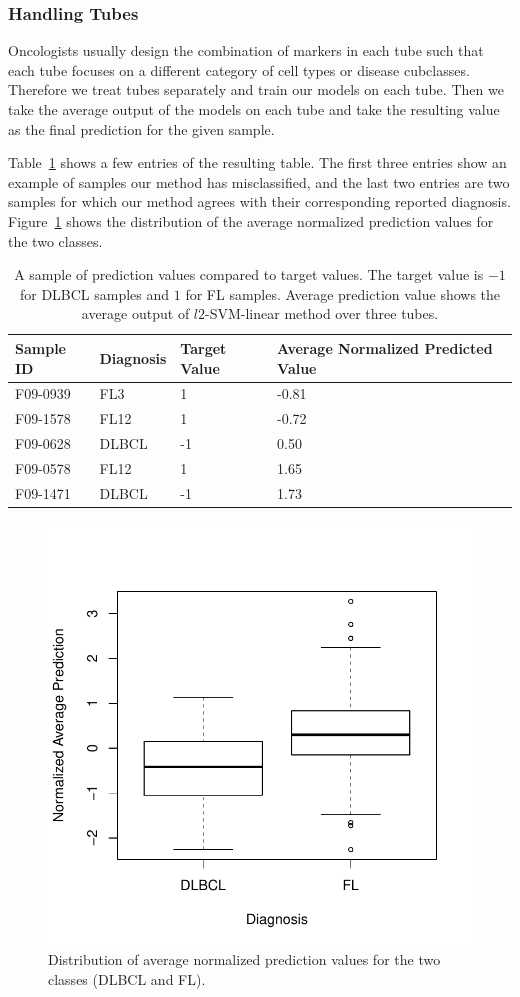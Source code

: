 \subsubsection{Handling Tubes}
Oncologists usually design the combination of markers in each tube such that each tube focuses on a different category of cell types or disease cubclasses. Therefore we treat tubes separately and train our models on each tube. Then we take the average output of the models on each tube and take the resulting value as the final prediction for the given sample.

Table~\ref{fig:fcs-qa-matchcount} shows a few entries of the resulting table. The first three entries show an example of samples our method has misclassified, and the last two entries are two samples for which our method agrees with their corresponding reported diagnosis. Figure~\ref{fig:fcs-qa-predictions-boxplot} shows the distribution of the average normalized prediction values for the two classes.

\begin{table}[!ht]
  \centering
  \begin{tabular}{llll}
    Sample ID & Diagnosis & Target Value & Average Normalized Predicted Value \\ \hline
    F09-0939 & FL3 & 1 & -0.81 \\
    F09-1578 & FL12 & 1 & -0.72 \\
    F09-0628 & DLBCL & -1 & 0.50 \\
    F09-0578 & FL12 & 1 & 1.65 \\
    F09-1471 & DLBCL & -1 & 1.73
  \end{tabular}
  \caption{A sample of prediction values compared to target values. The target value is $-1$ for DLBCL samples and $1$ for FL samples. Average prediction value shows the average output of $l2$-SVM-linear method over three tubes.}
  \label{fig:fcs-qa-matchcount}
\end{table}

\begin{figure}[!ht]
  \centering
  \includegraphics[width=.6\textwidth]{figs/fcs-qa/predictions_boxplot}
  \caption{Distribution of average normalized prediction values for the two classes (DLBCL and FL).}
  \label{fig:fcs-qa-predictions-boxplot}
\end{figure}


